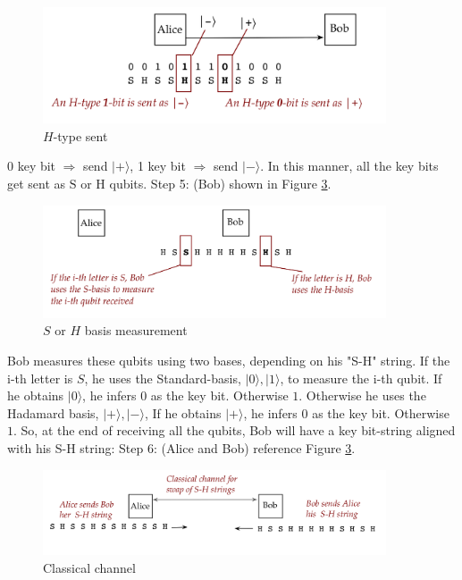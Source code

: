 \documentclass[main.tex]{subfiles}
\begin{document}
    \begin{figure}
        \centering
        \includegraphics[width=4in]{notes/figs/n05/37bb5.png}
        \caption{$H$-type sent}
        \label{fig:37bb5}
    \end{figure}
    
    0 key bit $\Rightarrow$ send $|+\rangle$, 1 key bit $\Rightarrow$ send $|-\rangle$. In this manner, all the key bits get sent as $\mathrm{S}$ or $\mathrm{H}$ qubits. Step 5: (Bob) shown in Figure \ref{fig:38bb6}.
    
    \begin{figure}
        \centering
        \includegraphics[width=4in]{notes/figs/n05/38bb6.png}
        \caption{$S$ or $H$ basis measurement}
        \label{fig:38bb6}
    \end{figure}
    
    Bob measures these qubits using two bases, depending on his "S-H" string. If the i-th letter is $S$, he uses the Standard-basis, $|0\rangle,|1\rangle$, to measure the i-th qubit. If he obtains $|0\rangle$, he infers 0 as the key bit. Otherwise $1.$ Otherwise he uses the Hadamard basis, $|+\rangle,|-\rangle$, If he obtains $|+\rangle$, he infers 0 as the key bit. Otherwise $1 .$ So, at the end of receiving all the qubits, Bob will have a key bit-string aligned with his S-H string: Step 6: (Alice and Bob) reference Figure \ref{fig:38bb6}.
    
    \begin{figure}
        \centering
        \includegraphics[width=4in]{notes/figs/n05/39bb7.png}
        \caption{Classical channel}
        \label{fig:38bb6}
    \end{figure}
    
\end{document}
